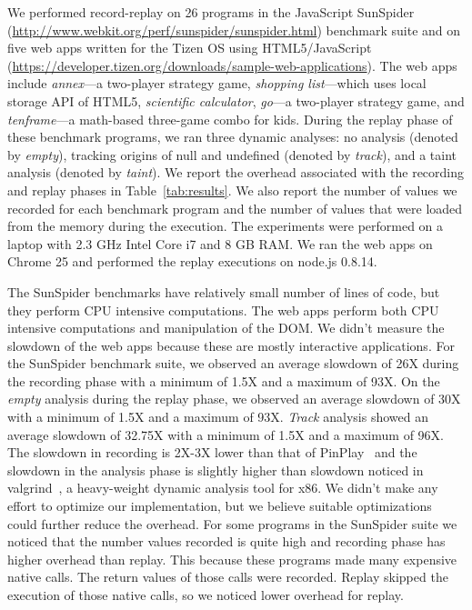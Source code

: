 \documentclass{sig-alternate}
\begin{document}
We performed record-replay on 26 programs in the JavaScript SunSpider
(\url{http://www.webkit.org/perf/sunspider/sunspider.html}) benchmark
suite and on five web apps written for the Tizen OS using
HTML5/JavaScript
(\url{https://developer.tizen.org/downloads/sample-web-applications}).
The web apps include \emph{annex}---a two-player strategy game,
\emph{shopping list}---which uses local storage API of HTML5,
\emph{scientific calculator}, \emph{go}---a two-player strategy game,
and \emph{tenframe}---a math-based three-game combo for kids.  During
the replay phase of these benchmark programs, we ran three dynamic
analyses: no analysis (denoted by \emph{empty}), tracking origins of
null and undefined (denoted by \emph{track}), and a taint analysis
(denoted by \emph{taint}).  We report the overhead associated with the
recording and replay phases in Table~\ref{tab:results}.  We also
report the number of values we recorded for each benchmark program and
the number of values that were loaded from the memory during the
execution.  The experiments were performed on a laptop with 2.3 GHz
Intel Core i7 and 8 GB RAM.  We ran the web apps on Chrome 25 and
performed the replay executions on node.js 0.8.14.

The SunSpider benchmarks have relatively small number of lines of
code, but they perform CPU intensive computations.  The web apps
perform both CPU intensive computations and manipulation of the DOM.
We didn't measure the slowdown of the web apps because these are
mostly interactive applications.  For the SunSpider benchmark suite,
we observed an average slowdown of 26X during the recording phase with
a minimum of 1.5X and a maximum of 93X.  On the \emph{empty} analysis
during the replay phase, we observed an average slowdown of 30X with a
minimum of 1.5X and a maximum of 93X.  \emph{Track} analysis showed an
average slowdown of 32.75X with a minimum of 1.5X and a maximum of
96X.  The slowdown in recording is 2X-3X lower than that of
PinPlay~\cite{Patil:2010:PFD:1772954.1772958} and the slowdown in the
analysis phase is slightly higher than slowdown noticed in
valgrind~\cite{Nethercote:2007:VFH:1250734.1250746}, a heavy-weight
dynamic analysis tool for x86.  We didn't make any effort to optimize
our implementation, but we believe suitable optimizations could
further reduce the overhead.  For some programs in the SunSpider suite
we noticed that the number values recorded is quite high and recording
phase has higher overhead than replay.  This because these programs
made many expensive native calls.  The return values of those calls
were recorded.  Replay skipped the execution of those native calls, so
we noticed lower overhead for replay.
\end{document}
